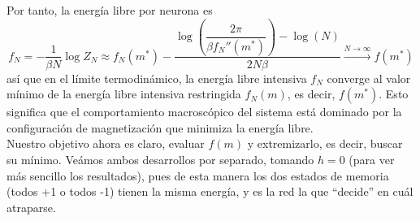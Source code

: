 \noindent
Por tanto, la energía libre por neurona es
\begin{equation*}
    f_N = -\frac{1}{\beta N} \log Z_N \approx f_N(m^*) - \frac{\log\left(\dfrac{2\pi}{\beta f_N''(m^*)}\right)-\log(N)}{2N\beta} \overset{N \to \infty}{\longrightarrow} f(m^*)
\end{equation*}
así que en el límite termodinámico, la energía libre intensiva $f_N$ converge al valor mínimo de la energía libre intensiva restringida $f_N(m)$, es decir, $f(m^*)$. Esto significa que el comportamiento macroscópico del sistema está dominado por la configuración de magnetización que minimiza la energía libre. \\

\noindent
Nuestro objetivo ahora es claro, evaluar $f(m)$ y extremizarlo, es decir, buscar su mínimo. Veámos ambos desarrollos por separado, tomando $h=0$ (para ver más sencillo los resultados), pues de esta manera los dos estados de memoria (todos +1 o todos -1) tienen la misma energía, y es la red la que ``decide'' en cuál atraparse.
